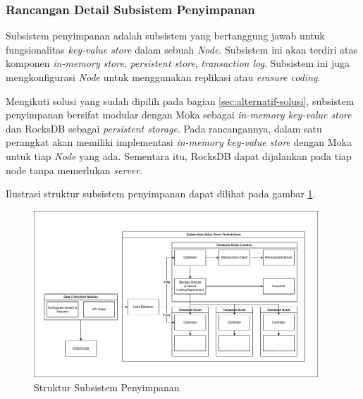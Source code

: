 \subsubsection{Rancangan Detail Subsistem Penyimpanan}
\label{subsubsection:detail-subsistem-penyimpanan}

Subsistem penyimpanan adalah subsistem yang bertanggung jawab untuk fungsionalitas \textit{key-value store} dalam sebuah \textit{Node}. Subsistem ini akan terdiri atas komponen \textit{in-memory store}, \textit{persistent store}, \textit{transaction log}. Subsistem ini juga mengkonfigurasi \textit{Node} untuk menggunakan replikasi atau \textit{erasure coding}.

Mengikuti solusi yang sudah dipilih pada bagian \ref{sec:alternatif-solusi}, subsistem penyimpanan bersifat modular dengan Moka sebagai \textit{in-memory key-value store} dan RocksDB sebagai \textit{persistent storage}. Pada rancangannya, dalam satu perangkat akan memiliki implementasi \textit{in-memory key-value store} dengan Moka untuk tiap \textit{Node} yang ada. Sementara itu, RocksDB dapat dijalankan pada tiap node tanpa memerlukan \textit{server}.

Ilustrasi struktur subsistem penyimpanan dapat dilihat pada gambar \ref{fig:storage-subsystem-structure}.

\begin{figure}[ht]
    \centering
    \includegraphics[width=0.95\textwidth]{resources/chapter-3/general-architecture.png}
    \caption{Struktur Subsistem Penyimpanan}
    \label{fig:storage-subsystem-structure}
\end{figure}
